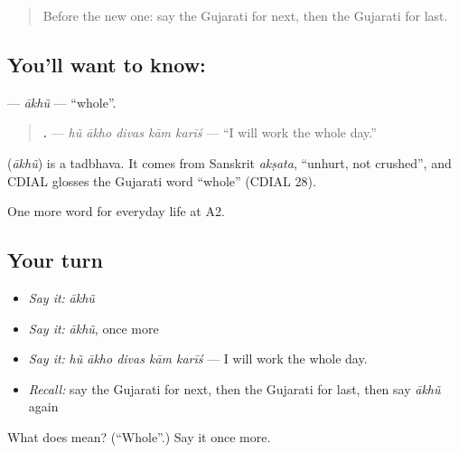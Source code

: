 \begin{quote}
Before the new one: say the Gujarati for next, then the Gujarati for last.
\end{quote}

\subsection*{You'll want to know: }
\textbf{} — \emph{ākhũ} — \textquotedblleft{}whole\textquotedblright{}.

\begin{quote}
\textbf{    .} — \emph{hũ ākho divas kām karīś} — \textquotedblleft{}I will work the whole day.\textquotedblright{}
\end{quote}

\begin{cousinweb}
\textbf{} (\emph{ākhũ}) is a tadbhava. It comes from Sanskrit \emph{akṣata}, \textquotedblleft{}unhurt, not crushed\textquotedblright{}, and CDIAL glosses the Gujarati word \textquotedblleft{}whole\textquotedblright{} (CDIAL 28).
\end{cousinweb}

\begin{grammarlens}[title={What you've built}]
One more word for everyday life at A2.
\end{grammarlens}

\subsection*{Your turn}
\begin{itemize}
\raggedright
  \item \emph{Say it:} \emph{ākhũ}
  \item \emph{Say it:} \emph{ākhũ}, once more
  \item \emph{Say it:} \emph{hũ ākho divas kām karīś} — I will work the whole day.
  \item \emph{Recall:} say the Gujarati for next, then the Gujarati for last, then say \emph{ākhũ} again
\end{itemize}

\begin{tcolorbox}[breakable,colback=teal!4,colframe=teal!35!black,title={Before you move on}]
What does  mean? (\textquotedblleft{}Whole\textquotedblright{}.) Say it once more.
\end{tcolorbox}
